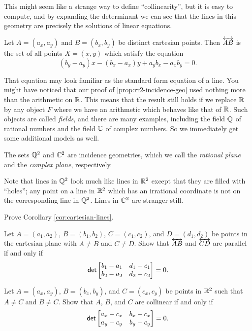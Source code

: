This might seem like a strange way to define ``collinearity'', but it is easy to compute, and by expanding the determinant we can see that the lines in this geometry are precisely the solutions of linear equations.

\begin{cor}[Lines in \(\RR^2\)]\label{cor:cartesian-lines}
Let \(A = (a_x, a_y)\) and \(B = (b_x, b_y)\) be distinct cartesian points.
Then \(\overleftrightarrow{AB}\) is the set of all points \(X = (x,y)\) which satisfy the equation \[ (b_y-a_y)x - (b_x-a_x)y + a_yb_x - a_xb_y = 0. \]
\end{cor}

That equation may look familiar as the standard form equation of a line.
You might have noticed that our proof of \ref{prop:rr2-incidence-geo} used nothing more than the arithmetic on \(\mathbb{R}\).
This means that the result still holds if we replace \(\mathbb{R}\) by any object \(F\) where we have an arithmetic which behaves like that of \(\mathbb{R}\).
Such objects are called \emph{fields}, and there are many examples, including the field \(\mathbb{Q}\) of rational numbers and the field \(\mathbb{C}\) of complex numbers.
So we immediately get some additional models as well.

\begin{cor}
The sets \(\mathbb{Q}^2\) and \(\mathbb{C}^2\) are incidence geometries, which we call the \emph{rational plane} and the \emph{complex plane}, respectively.
\end{cor}

Note that lines in \(\mathbb{Q}^2\) look much like lines in \(\RR^2\) except that they are filled with ``holes''; any point on a line in \(\RR^2\) which has an irrational coordinate is not on the corresponding line in \(\mathbb{Q}^2\).
Lines in \(\mathbb{C}^2\) are stranger still.



\Exercises%

\begin{exercise}
Prove Corollary \ref{cor:cartesian-lines}.
\end{exercise}

\begin{exercise} \label{exerc:parallels-in-rr2}
Let \(A = (a_1,a_2)\), \(B = (b_1,b_2)\), \(C = (c_1,c_2)\), and \(D = (d_1,d_2)\) be points in the cartesian plane with \(A \neq B\) and \(C \neq D\).
Show that \(\overleftrightarrow{AB}\) and \(\overleftrightarrow{CD}\) are parallel if and only if \[ \mathsf{det} \begin{bmatrix} b_1 - a_1 & d_1 - c_1 \\ b_2 - a_2 & d_2 - c_2 \end{bmatrix} = 0. \]
\end{exercise}


\begin{exercise}
Let \(A = (a_x,a_y)\), \(B = (b_x,b_y)\), and \(C = (c_x,c_y)\) be points in \(\RR^2\) such that \(A \neq C\) and \(B \neq C\).
Show that \(A\), \(B\), and \(C\) are collinear if and only if \[ \mathsf{det} \begin{bmatrix} a_x - c_x & b_x - c_x \\ a_y - c_y & b_y - c_y \end{bmatrix} = 0. \]
\end{exercise}
